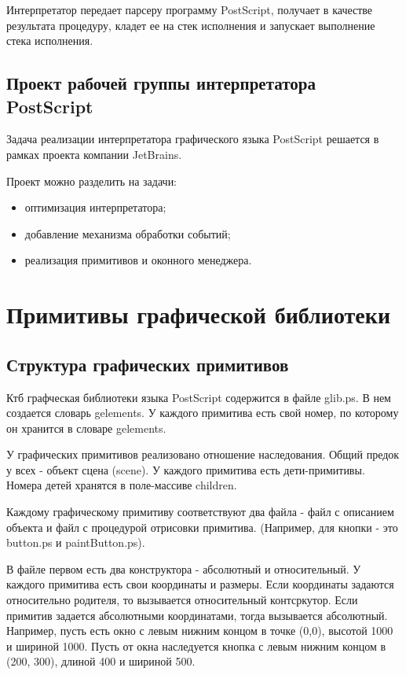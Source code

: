 \documentclass[14pt]{extarticle}
\begin{document}
		Интерпретатор передает парсеру программу PostScript, получает в качестве результата процедуру, кладет ее на стек исполнения и запускает выполнение стека исполнения.
		
	\subsection{ Проект рабочей группы интерпретатора PostScript }
Задача реализации интерпретатора графического языка PostScript решается в рамках проекта компании JetBrains. 
		
		Проект можно разделить на задачи:
		\begin{itemize}
		\item оптимизация интерпретатора;
		\item добавление механизма обработки событий;
		\item реализация примитивов и оконного менеджера.
		\end{itemize}	
	
	\pagebreak
	\section{Примитивы графической библиотеки}
	\subsection*{Структура графических примитивов}
		Ктб графческая библиотеки языка PostScript содержится в файле  glib.ps. В нем создается словарь gelements. У каждого примитива есть свой номер, по которому он хранится в словаре gelements. 
		
		У графических примитивов реализовано отношение наследования. Общий предок у всех - объект сцена (scene). У каждого примитива есть дети-примитивы. Номера детей хранятся в поле-массиве children.
		
		Каждому графическому примитиву соответствуют два файла - файл с описанием объекта и файл с процедурой отрисовки примитива. (Например, для кнопки - это button.ps и paintButton.ps). 
		
		В файле первом есть два конструктора - абсолютный и относительный. У каждого примитива есть свои координаты и размеры. Если координаты задаются относительно родителя, то вызывается относительный контсркутор. Если примитив задается абсолютными координатами, тогда вызывается абсолютный. Например, пусть есть окно с левым нижним концом в точке (0,0), высотой 1000 и шириной 1000. Пусть от окна наследуется кнопка с левым нижним концом в (200, 300), длиной 400 и шириной 500. 
		
\end{document}
